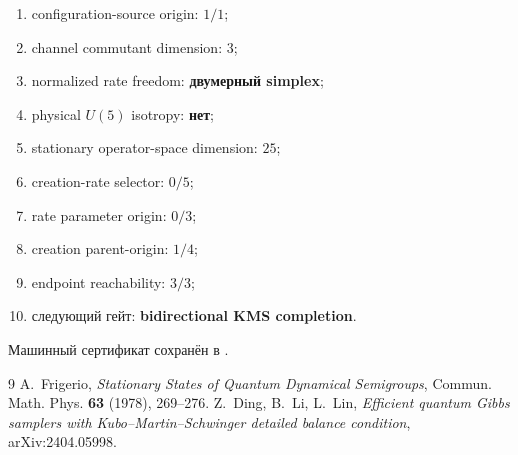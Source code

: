 \begin{protocol}\begin{enumerate}
\item configuration-source origin: \textbf{$1/1$};
\item channel commutant dimension: \textbf{$3$};
\item normalized rate freedom: \textbf{двумерный simplex};
\item physical $U(5)$ isotropy: \textbf{нет};
\item stationary operator-space dimension: \textbf{$25$};
\item creation-rate selector: \textbf{$0/5$};
\item rate parameter origin: \textbf{$0/3$};
\item creation parent-origin: \textbf{$1/4$};
\item endpoint reachability: \textbf{$3/3$};
\item следующий гейт: \textbf{bidirectional KMS completion}.
\end{enumerate}\end{protocol}

Машинный сертификат сохранён в
.

\begin{thebibliography}{9}
A.~Frigerio, \emph{Stationary States of Quantum Dynamical Semigroups},
Commun. Math. Phys. \textbf{63} (1978), 269--276.
Z.~Ding, B.~Li, L.~Lin, \emph{Efficient quantum Gibbs samplers with
Kubo--Martin--Schwinger detailed balance condition}, arXiv:2404.05998.
\end{thebibliography}